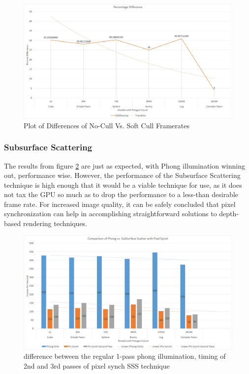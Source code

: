 \documentclass[a4paper, 12pt]{article}
\begin{document}
\begin{figure}[!htb]
	\centering
	\includegraphics[width=1.0\textwidth]{CDPercentGraph.jpg}
	\caption{Plot of Differences of No-Cull Vs. Soft Cull Framerates}
	\label{pic:CDPercentGraph}
\end{figure}

\subsubsection{Subsurface Scattering}

The results from figure \ref{pic:SSSGraph} are just as expected, with Phong
illumination winning out, performance wise. However, the performance of the
Subsurface Scattering technique is high enough that it would be a viable
technique for use, as it does not tax the GPU so much as to drop the
performance to a less-than desirable frame rate. For increased image quality,
it can be safely concluded that pixel synchronization can help in
accomplishing straightforward solutions to depth-based rendering techniques.

\begin{figure}[!htb]
	\centering
	\includegraphics[width=1.0\textwidth]{SSSGraph.jpg}
	\caption{difference between the regular 1-pass phong illumination, timing of 2nd and 3rd passes of pixel synch SSS technique}
	\label{pic:SSSGraph}
\end{figure}
\end{document}
